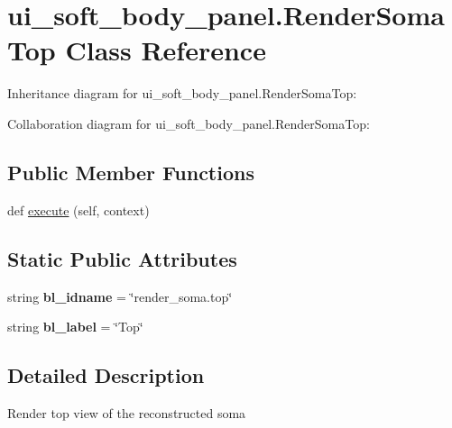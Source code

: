 \hypertarget{classui__soft__body__panel_1_1RenderSomaTop}{}\section{ui\+\_\+soft\+\_\+body\+\_\+panel.\+Render\+Soma\+Top Class Reference}
\label{classui__soft__body__panel_1_1RenderSomaTop}


Inheritance diagram for ui\+\_\+soft\+\_\+body\+\_\+panel.\+Render\+Soma\+Top\+:


Collaboration diagram for ui\+\_\+soft\+\_\+body\+\_\+panel.\+Render\+Soma\+Top\+:
\subsection*{Public Member Functions}
\begin{DoxyCompactItemize}
\item 
def \hyperlink{classui__soft__body__panel_1_1RenderSomaTop_a19ccd9940467120541fd6142a6405dbe}{execute} (self, context)
\end{DoxyCompactItemize}
\subsection*{Static Public Attributes}
\begin{DoxyCompactItemize}
\item 
string {\bfseries bl\+\_\+idname} = \char`\"{}render\+\_\+soma.\+top\char`\"{}\hypertarget{classui__soft__body__panel_1_1RenderSomaTop_a0882c8a3bfa8d35e04851f5b049afa20}{}\label{classui__soft__body__panel_1_1RenderSomaTop_a0882c8a3bfa8d35e04851f5b049afa20}

\item 
string {\bfseries bl\+\_\+label} = \char`\"{}Top\char`\"{}\hypertarget{classui__soft__body__panel_1_1RenderSomaTop_a87cfa9692a37c08accccf237c7157399}{}\label{classui__soft__body__panel_1_1RenderSomaTop_a87cfa9692a37c08accccf237c7157399}

\end{DoxyCompactItemize}


\subsection{Detailed Description}
\begin{DoxyVerb}Render top view of the reconstructed soma\end{DoxyVerb}
 

